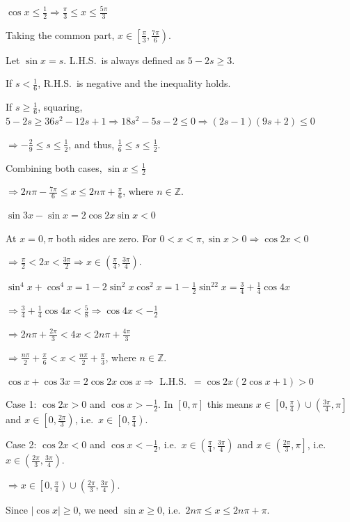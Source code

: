   $\cos x\leq \frac{1}{2}\Rightarrow \frac{\pi}{3}\leq x\leq \frac{5\pi}{3}$

  Taking the common part, $x\in\left[\frac{\pi}{3}, \frac{7\pi}{6}\right)$.
\item Let $\sin x = s$. L.H.S.\ is always defined as $5 - 2s\geq 3$.

  If $s < \frac{1}{6}$, R.H.S.\ is negative and the inequality holds.

  If $s\geq \frac{1}{6}$, squaring, $5 - 2s\geq 36s^2 - 12s + 1\Rightarrow 18s^2 - 5s - 2\leq 0\Rightarrow
  (2s - 1)(9s + 2)\leq 0$

  $\Rightarrow -\frac{2}{9}\leq s\leq \frac{1}{2}$, and thus, $\frac{1}{6}\leq s\leq \frac{1}{2}$.

  Combining both cases, $\sin x\leq \frac{1}{2}$

  $\Rightarrow 2n\pi - \frac{7\pi}{6}\leq x\leq 2n\pi + \frac{\pi}{6}$, where $n\in\mathbb{Z}$.
\item $\sin3x - \sin x = 2\cos2x\sin x < 0$

  At $x = 0, \pi$ both sides are zero. For $0 < x < \pi, \sin x > 0\Rightarrow \cos2x < 0$

  $\Rightarrow \frac{\pi}{2} < 2x < \frac{3\pi}{2}\Rightarrow x\in\left(\frac{\pi}{4},
  \frac{3\pi}{4}\right)$.
\item $\sin^4x + \cos^4x = 1 - 2\sin^2x\cos^2x = 1 - \frac{1}{2}\sin^22x = \frac{3}{4} + \frac{1}{4}\cos4x$

  $\Rightarrow \frac{3}{4} + \frac{1}{4}\cos4x < \frac{5}{8}\Rightarrow \cos4x < -\frac{1}{2}$

  $\Rightarrow 2n\pi + \frac{2\pi}{3} < 4x < 2n\pi + \frac{4\pi}{3}$

  $\Rightarrow \frac{n\pi}{2} + \frac{\pi}{6} < x < \frac{n\pi}{2} + \frac{\pi}{3}$, where
  $n\in\mathbb{Z}$.
\item $\cos x + \cos3x = 2\cos2x\cos x\Rightarrow$ L.H.S.\ $= \cos2x(2\cos x + 1) > 0$

  Case 1: $\cos2x > 0$ and $\cos x > -\frac{1}{2}$. In $[0, \pi]$ this means $x\in\left[0,
  \frac{\pi}{4}\right)\cup\left(\frac{3\pi}{4}, \pi\right]$ and $x\in\left[0, \frac{2\pi}{3}\right)$, i.e.\
  $x\in\left[0, \frac{\pi}{4}\right)$.

  Case 2: $\cos2x < 0$ and $\cos x < -\frac{1}{2}$, i.e.\ $x\in\left(\frac{\pi}{4},
  \frac{3\pi}{4}\right)$ and $x\in\left(\frac{2\pi}{3}, \pi\right]$, i.e.\ $x\in\left(\frac{2\pi}{3},
  \frac{3\pi}{4}\right)$.

  $\Rightarrow x\in\left[0, \frac{\pi}{4}\right)\cup\left(\frac{2\pi}{3}, \frac{3\pi}{4}\right)$.
\item Since $|\cos x|\geq 0$, we need $\sin x\geq 0$, i.e.\ $2n\pi\leq x\leq 2n\pi + \pi$.

